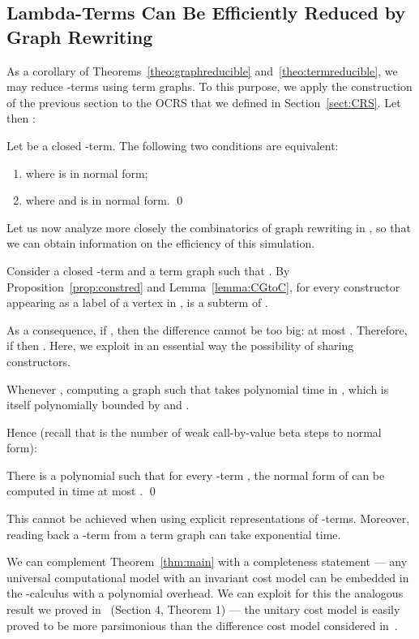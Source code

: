 \documentclass{LMCS}
\newenvironment{varitemize}
{
\begin{list}{\labelitemi}
{\setlength{\itemsep}{0.0mm}
 \setlength{\topsep}{0.0mm}
 \setlength{\parindent}{0.0mm}
 \setlength{\parskip}{0.0mm}
 \setlength{\parsep}{0.0mm}
 \setlength{\partopsep}{0.0mm}
 \setlength{\leftmargin}{15pt}
 \setlength{\labelsep}{5pt}
 \setlength{\labelwidth}{10pt}}}
{
 \end{list} 
}
\newcounter{number}
\begin{document}
\subsection{Lambda-Terms Can Be Efficiently Reduced by Graph Rewriting}
\label{sect:MainResult}
As a corollary of Theorems~\ref{theo:graphreducible} and~\ref{theo:termreducible},
we may reduce -terms using term graphs.
To this purpose, we apply the construction of the previous section
to the OCRS  that we defined in Section~\ref{sect:CRS}. Let 
then :
\begin{cor}
Let  be a closed -term. The following
two conditions are equivalent:
\begin{enumerate}[\em 1.]
\item
   where  is in normal form;
\item
   where
   and  is in normal form. \qed
\end{enumerate}
\end{cor} 
Let us now analyze more closely the combinatorics 
of graph rewriting in , so that we can obtain information on the efficiency of this simulation. 
\begin{varitemize}
\item
  Consider a closed -term  and a term graph  such
  that . By Proposition~\ref{prop:constred}
  and Lemma~\ref{lemma:CGtoC}, for every constructor  appearing
  as a label of a vertex in ,  is a subterm of . 
\item
  As a consequence, if ,
  then the difference  cannot be too big: at most
  . Therefore, if 
   then .
  Here, we exploit in an essential way the possibility of sharing constructors.
\item
  Whenever , computing
  a graph  such that  takes polynomial time in
  , which is itself polynomially bounded by  and .
\end{varitemize}
Hence (recall that  is the number of weak call-by-value beta steps to normal form): 
\begin{thm}\label{thm:main}
There is a polynomial  such that for every -term ,
the normal form of  can be computed in time at most 
. \qed
\end{thm}
This cannot be achieved when using explicit representations
of -terms. Moreover, reading back a -term from a term graph can take exponential
time.

We can complement Theorem~\ref{thm:main} with a completeness statement --- any universal computational model 
with an invariant cost model can be embedded in the -calculus with a polynomial
overhead. We can exploit for this the analogous result we proved in~\cite{CIE2006} (Section 4, Theorem 1) --- 
the unitary cost model is easily proved to be more parsimonious than 
the difference cost model considered in~\cite{CIE2006}.
\end{document}
